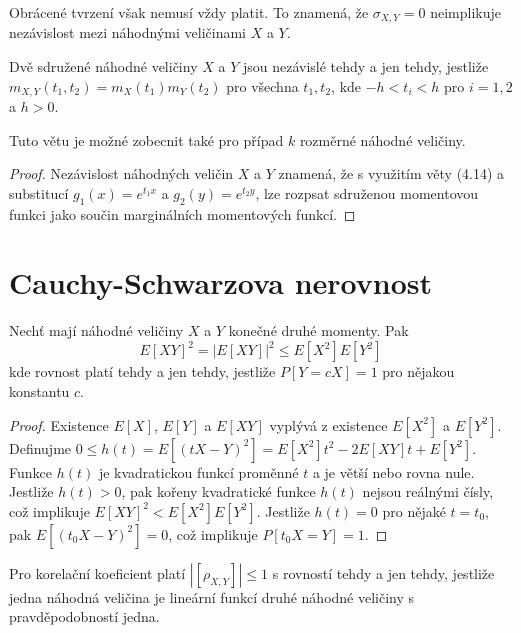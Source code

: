 Obrácené tvrzení však nemusí vždy platit. To znamená, že $\sigma_{X,Y} = 0$ neimplikuje nezávislost mezi náhodnými veličinami $X$ a $Y$.

\begin{theorem}
Dvě sdružené náhodné veličiny $X$ a $Y$ jsou nezávislé tehdy a jen tehdy, jestliže $m_{X,Y}(t_1, t_2) = m_X(t_1)m_Y(t_2)$ pro všechna $t_1, t_2$, kde $-h < t_i < h$ pro $i = 1, 2$ a $h > 0$.
\end{theorem}

Tuto větu je možné zobecnit také pro případ $k$ rozměrné náhodné veličiny.

\begin{proof}
Nezávislost náhodných veličin $X$ a $Y$ znamená, že s využitím věty (4.14) a substitucí $g_1(x) = e^{t_1 x}$ a $g_2(y) = e^{t_2 y}$, lze rozpsat sdruženou momentovou funkci jako součin marginálních momentových funkcí. 
\end{proof}

\section{Cauchy-Schwarzova nerovnost}

\begin{theorem}
Nechť mají náhodné veličiny $X$ a $Y$ konečné druhé  momenty. Pak
\begin{equation*}
E[XY]^2 = |E[XY]|^2 \le E[X^2]E[Y^2]
\end{equation*}
kde rovnost platí tehdy a jen tehdy, jestliže $P[Y = cX] = 1$ pro nějakou konstantu $c$.
\end{theorem}

\begin{proof}
Existence $E[X]$, $E[Y]$ a $E[XY]$ vyplývá z existence $E[X^2]$ a $E[Y^2]$. Definujme $0 \le h(t) = E[(tX - Y)^2] = E[X^2]t^2 - 2E[XY]t + E[Y^2]$. Funkce $h(t)$ je kvadratickou funkcí proměnné $t$ a je větší nebo rovna nule. Jestliže $h(t) > 0$, pak kořeny kvadratické funkce $h(t)$ nejsou reálnými čísly, což implikuje $E[XY]^2 < E[X^2]E[Y^2]$. Jestliže $h(t) = 0$ pro nějaké $t = t_0$, pak $E[(t_0X - Y)^2] = 0$, což implikuje $P[t_0 X = Y] = 1$.
\end{proof}

\begin{corollary}
Pro korelační koeficient platí $|[\rho_{X,Y}]| \le 1$ s rovností tehdy a jen tehdy, jestliže jedna náhodná veličina je lineární funkcí druhé náhodné veličiny s pravděpodobností jedna.
\end{corollary}

